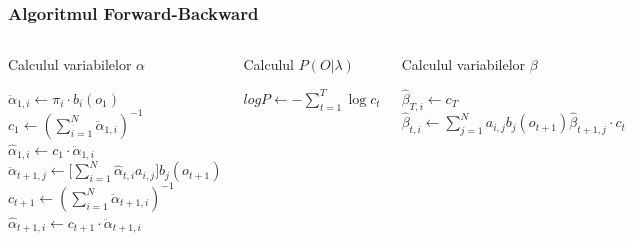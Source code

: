 \begin{frame}[fragile]
  \frametitle{Algoritmul Forward-Backward} \vspace*{-1.5em}
  \begin{columns}[T]
    \begin{algorithm}[H]
      \scriptsize
      \caption{Calculul variabilelor $\alpha$}
      \label{alg1}
       
      \begin{algorithmic}[2]
         \STATE $\ddot{\alpha}_{1,i} \leftarrow
        \pi_i \cdot b_i(o_1)$
        \ENDFOR
        \STATE $c_1 \leftarrow (\displaystyle\sum_{i=1}^{N}
        \ddot{\alpha}_{1,i})^{-1}$  \STATE
        $\hat{\alpha}_{1,i} \leftarrow c_1 \cdot \ddot{\alpha}_{1,i}$
        \ENDFOR
          \STATE
        $\ddot{\alpha}_{t+1,j} \leftarrow \Big[
        \displaystyle\sum_{i=1}^{N}\hat{\alpha}_{t,i}a_{i,j}\Big]
        b_{j}(o_{t+1})$
        \ENDFOR
        \STATE $c_{t+1} \leftarrow (\displaystyle\sum_{i=1}^{N}
        \ddot{\alpha}_{t+1,i})^{-1}$  \STATE
        $\hat{\alpha}_{t+1,i} \leftarrow c_{t+1} \cdot
        \ddot{\alpha}_{t+1,i}$
        \ENDFOR
        \ENDFOR
      \end{algorithmic}
    \end{algorithm}
    \begin{algorithm}[H]
      \scriptsize
      \caption{Calculul $P(O \vert \lambda)$}
      \label{alg2}
       
      \begin{algorithmic}[2]
        \STATE $logP \leftarrow -\displaystyle\sum_{t=1}^{T}\log c_t$
      \end{algorithmic}
    \end{algorithm}
    \vspace*{1em}
    \begin{algorithm}[H]
      \scriptsize
      \caption{Calculul variabilelor $\beta$}
      \label{alg3}
       
      \begin{algorithmic}[2]
         \STATE $\hat{\beta}_{T,i} \leftarrow c_T$
        \ENDFOR
          \STATE
        $\hat{\beta}_{t,i} \leftarrow \displaystyle\sum_{j=1}^{N}
        a_{i,j} b_{j}(o_{t+1}) \hat{\beta}_{t+1,j} \cdot c_t$
        \ENDFOR
        \ENDFOR
      \end{algorithmic}
    \end{algorithm}
  \end{columns}
\end{frame}

